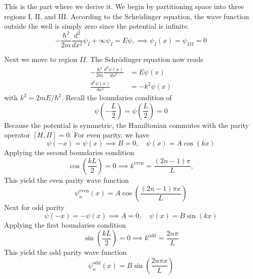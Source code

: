 \documentclass[../../../main.tex]{subfiles}
\begin{document}
This is the part where we derive it.
We begin by partitioning space into three regions I, II, and III.
According to the Schrödinger equation, the wave function outside the well is simply zero since the potential is infinite.
\begin{equation*}
  -\frac{\hbar^2 }{2m }\frac{d^2 }{dx^2 }\psi_I+\infty \psi_I=E\psi,\implies \psi_I(x)=\psi_{III}=0
\end{equation*}

Next we move to region $II$.
The Schrödinger equation now reads
\begin{align*}
  -\frac{\hbar^2}{2m} \frac{d^2 \psi(x)}{dx^2} & =  E \psi(x)   \\
  \frac{d^2 \psi(x)}{dx^2}                     & = -k^2 \psi(x)
\end{align*}
with $k^2 =2 m E/\hbar^2.$
Recall the boundaries condition of
\begin{equation*}
  \psi \left( -\frac{L }{2 } \right) =\psi \left( \frac{L }{2 } \right) =0
\end{equation*}
Because the potential is symmetric, the Hamiltonian commutes with the parity operator $[H,\Pi] = 0$.
For even parity, we have
\begin{equation*}
  \psi(-x) = \psi(x) \implies B = 0, \quad \psi(x) = A \cos(kx)
\end{equation*}
Applying the second boundaries condition
\begin{equation*}
  \cos\left(\frac{k L}{2}\right) = 0\implies k^{\text{even}} = \frac{(2n-1)\pi}{L},
\end{equation*}
This yield the even parity wave function
\begin{equation*}
  \psi_n^{\text{even}}(x) =A \cos\left(\frac{(2n-1)\pi x}{L}\right)
\end{equation*}
Next for odd parity
\begin{equation*}
  \psi(-x) = -\psi(x) \implies A = 0, \quad \psi(x) = B \sin(kx)
\end{equation*}
Applying the first boundaries condition
\begin{equation*}
  \sin\left(\frac{k L}{2}\right) = 0 \implies k^{\text{odd}} = \frac{2 n \pi}{L}
\end{equation*}
This yield the odd parity wave function
\begin{equation*}
  \psi_n^{\text{odd}}(x) = B \sin\left(\frac{2 n \pi x}{L}\right)
\end{equation*}
\end{document}
